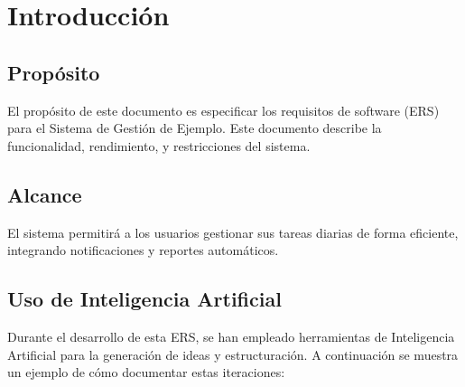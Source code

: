 \chapter{Introducción}

\section{Propósito}
El propósito de este documento es especificar los requisitos de software (ERS) para el Sistema de Gestión de Ejemplo. Este documento describe la funcionalidad, rendimiento, y restricciones del sistema.

\section{Alcance}
El sistema permitirá a los usuarios gestionar sus tareas diarias de forma eficiente, integrando notificaciones y reportes automáticos.

\section{Uso de Inteligencia Artificial}
Durante el desarrollo de esta ERS, se han empleado herramientas de Inteligencia Artificial para la generación de ideas y estructuración. A continuación se muestra un ejemplo de cómo documentar estas iteraciones:

\begin{aiiteration}
\end{aiiteration}
